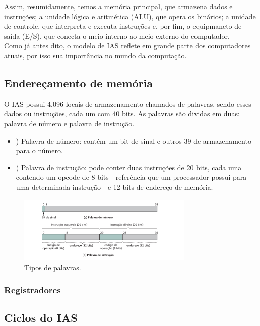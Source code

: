 \documentclass{article}
\begin{document}
Assim, resumidamente, temos a memória principal, que armazena dados e
instruções; a unidade lógica e aritmética (ALU), que opera os binários; a
unidade de controle, que interpreta e executa instruções e, por fim, o
equipmaneto de saída (E/S), que conecta o meio interno ao meio externo do
computador. \\

Como já antes dito, o modelo de IAS reflete em grande parte dos computadores atuais, por isso sua importância no mundo da computação.

\subsection{Endereçamento de memória}
O IAS possui 4.096 locais de armazenamento chamados de palavras, sendo esses dados ou instruções, cada um com 40 bits. As palavras são dividas em duas: palavra de número e palavra de instrução. \\

\begin{itemize}
	\item{}) Palavra de número: contém um bit de sinal e outros 39 de armazenamento para o número. \\
	\item{}) Palavra de instrução: pode conter duas instruções de 20 bits, cada uma contendo um opcode de 8 bits - referência que um processador possui para uma determinada instrução - e 12 bits de endereço de memória.
\end{itemize}

\begin{figure}[h]
    \caption{Tipos de palavras.}
    \centering
    \includegraphics[width=0.75\textwidth]{palavras.png}
\end{figure}

\subsubsection{Registradores}
\subsection{Ciclos do IAS}
\end{document}
